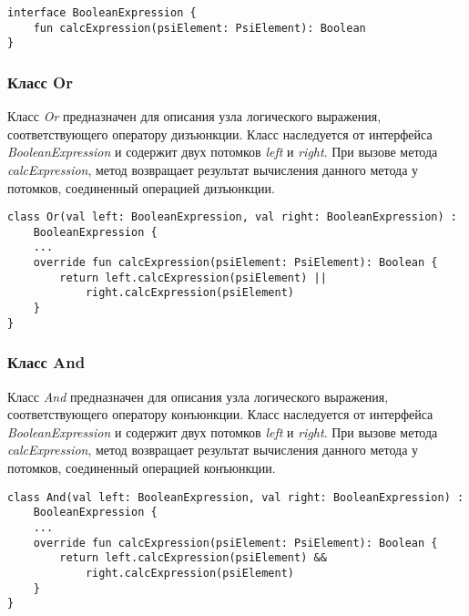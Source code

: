 \begin{lstlisting}[style={java}, label={lst:BooleanExpression},
  caption={Интерфейс BooleanExpression}]
interface BooleanExpression {
    fun calcExpression(psiElement: PsiElement): Boolean
}
\end{lstlisting}
\subsubsection{Класс Or}
\label{ssub:Or}
Класс \textit{Or} предназначен для описания узла логического выражения,
соответствующего оператору дизъюнкции.
Класс наследуется от интерфейса \textit{BooleanExpression} и содержит двух
потомков \textit{left} и \textit{right}.
При вызове метода \textit{calcExpression}, метод возвращает результат вычисления
данного метода у потомков, соединенный операцией дизъюнкции.

\begin{lstlisting}[style={java}, label={lst:Or},
  caption={Класс Or}]
class Or(val left: BooleanExpression, val right: BooleanExpression) :
	BooleanExpression {
	...
    override fun calcExpression(psiElement: PsiElement): Boolean {
        return left.calcExpression(psiElement) ||
        	right.calcExpression(psiElement)
    }
}
\end{lstlisting}
\subsubsection{Класс And}
\label{ssub:And}
Класс \textit{And} предназначен для описания узла логического выражения,
соответствующего оператору конъюнкции.
Класс наследуется от интерфейса \textit{BooleanExpression} и содержит двух
потомков \textit{left} и \textit{right}.
При вызове метода \textit{calcExpression}, метод возвращает результат вычисления
данного метода у потомков, соединенный операцией конъюнкции.

\begin{lstlisting}[style={java}, label={lst:And},
  caption={Класс And}]
class And(val left: BooleanExpression, val right: BooleanExpression) :
	BooleanExpression {
	...
    override fun calcExpression(psiElement: PsiElement): Boolean {
        return left.calcExpression(psiElement) &&
        	right.calcExpression(psiElement)
    }
}
\end{lstlisting}
